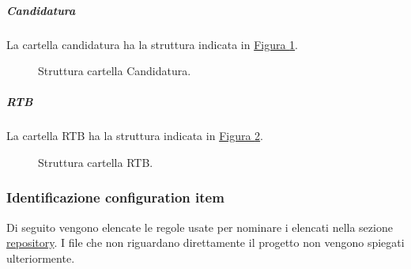 \subparagraph{Candidatura}
La cartella candidatura ha la struttura indicata in \hyperref[fig:repo_sorgenti_documenti_candidatura]{Figura \ref{fig:repo_sorgenti_documenti_candidatura}}.
\begin{figure}[H]
    \caption{Struttura cartella Candidatura.}
    \label{fig:repo_sorgenti_documenti_candidatura}
\end{figure}

\subparagraph{RTB}
La cartella RTB ha la struttura indicata in \hyperref[fig:repo_sorgenti_documenti_RTB]{Figura \ref{fig:repo_sorgenti_documenti_RTB}}.
\begin{figure}[H]
    \caption{Struttura cartella RTB.}
    \label{fig:repo_sorgenti_documenti_RTB}
\end{figure}

\subsubsection{Identificazione configuration item}
\label{subsubsec:identificazione_CI}
Di seguito vengono elencate le regole usate per nominare i  elencati nella sezione \hyperref[subsubsec:repository]{repository}.
I file che non riguardano direttamente il progetto non vengono spiegati ulteriormente. 

